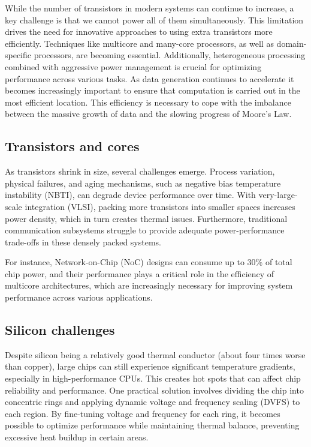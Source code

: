 While the number of transistors in modern systems can continue to increase, a key challenge is that we cannot power all of them simultaneously. 
This limitation drives the need for innovative approaches to using extra transistors more efficiently. 
Techniques like multicore and many-core processors, as well as domain-specific processors, are becoming essential. 
Additionally, heterogeneous processing combined with aggressive power management is crucial for optimizing performance across various tasks.
As data generation continues to accelerate it becomes increasingly important to ensure that computation is carried out in the most efficient location.
This efficiency is necessary to cope with the imbalance between the massive growth of data and the slowing progress of Moore's Law.

\subsection{Transistors and cores}
As transistors shrink in size, several challenges emerge. 
Process variation, physical failures, and aging mechanisms, such as negative bias temperature instability (NBTI), can degrade device performance over time. 
With very-large-scale integration (VLSI), packing more transistors into smaller spaces increases power density, which in turn creates thermal issues. 
Furthermore, traditional communication subsystems struggle to provide adequate power-performance trade-offs in these densely packed systems. 

For instance, Network-on-Chip (NoC) designs can consume up to 30\% of total chip power, and their performance plays a critical role in the efficiency of multicore architectures, which are increasingly necessary for improving system performance across various applications.

\subsection{Silicon challenges}
Despite silicon being a relatively good thermal conductor (about four times worse than copper), large chips can still experience significant temperature gradients, especially in high-performance CPUs. 
This creates hot spots that can affect chip reliability and performance. 
One practical solution involves dividing the chip into concentric rings and applying dynamic voltage and frequency scaling (DVFS) to each region. 
By fine-tuning voltage and frequency for each ring, it becomes possible to optimize performance while maintaining thermal balance, preventing excessive heat buildup in certain areas.


